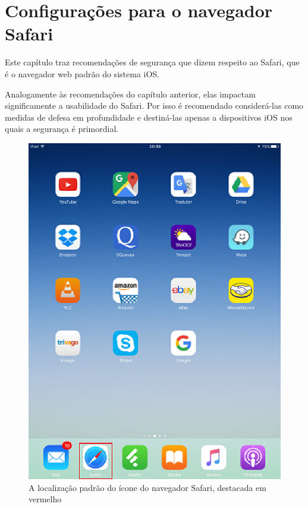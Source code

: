 \chapter{Configura\c c\~oes para o navegador Safari}

Este cap\'itulo traz recomenda\c c\~oes de seguran\c ca que dizem respeito ao Safari, que \'e o navegador web padr\~ao do sistema iOS. 

Analogamente \`as recomenda\c c\~oes do cap\'itulo anterior, elas impactam significamente a usabilidade do Safari. Por isso \'e recomendado consider\'a-las como medidas de defesa em profundidade e destin\'a-las apenas a dispositivos iOS nos quais a seguran\c ca \'e primordial.

\begin{figure}[h]
  \centering
  \includegraphics{imagem3.eps}
  \caption{A localiza\c c\~ao padr\~ao do \'icone do navegador Safari, destacada em vermelho}
\end{figure}

